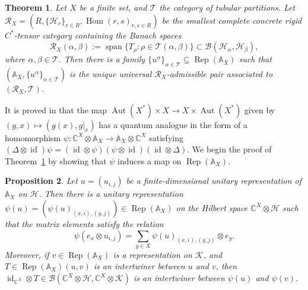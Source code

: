 \documentclass[12pt, a4paper]{amsart}
\def\Aut{\operatorname{Aut}}
\def\id{\operatorname{id}}
\def\Hom{\operatorname{Hom}}
\def\spn{\operatorname{span}}
\def\Rep{\operatorname{Rep}}
\def\A{\mathbb{A}}
\def\C{\mathbb{C}}
\def\BB{\mathcal{B}}
\def\CC{\mathcal{C}}
\def\HH{\mathcal{H}}
\def\KK{\mathcal{K}}
\def\RR{\mathcal{R}}
\def\TT{\mathcal{T}}
\newtheorem{thm}{Theorem}[section]
\newtheorem{prop}[thm]{Proposition}
\theoremstyle{definition}
\theoremstyle{remark}
\numberwithin{equation}{section}
\begin{document}
\begin{thm} \label{thm:TannakaKrein}
	Let $X$ be a finite set, and $\TT$ the category of tubular partitions. Let $\RR_X = (R, \{\HH_r\}_{r\in R}, \Hom(r,s)_{r,s\in R} )$ be the smallest complete concrete rigid $C^*$-tensor category containing the Banach spaces
	\[
	\RR_X(\alpha,\beta) := \spn\{T_\rho: \rho\in\TT(\alpha,\beta)\}\subset \BB(\HH_\alpha,\HH_\beta),
	\]
	where $\alpha,\beta\in\TT$. Then there is a family $\{u^\alpha\}_{\alpha\in\TT}\subseteq \operatorname{Rep}(\A_X)$ such that $(\mathbb{A}_X,\{u^\alpha\}_{\alpha\in\TT})$ is the unique universal $\RR_X$-admissible pair associated to $(\RR_X,\TT)$.
\end{thm}


It is proved in \cite[Theorem~4.5]{BR2025} that the map $\Aut(X^*)\times X\to X\times\Aut(X^*)$ given by $(g,x)\mapsto (g(x),g|_x)$ has a quantum analogue in the form of a homomorphism $\psi : \C^X \otimes \A_X \to \A_X\otimes\C^X$ satisfying $(\Delta\otimes\id)\psi = (\id\otimes\psi)(\psi\otimes\id)(\id\otimes\Delta)$. We begin the proof of Theorem~\ref{thm:TannakaKrein} by showing that $\psi$ induces a map on $\Rep(\A_X)$. 

\begin{prop} \label{prop:psiobj}
	Let $u = (u_{i,j})$ be a finite-dimensional unitary representation of $\A_X$ on $\HH$. Then there is a unitary representation $\psi(u) = (\psi(u)_{(x,i),(y,j)}) \in \Rep(\A_X)$ on the Hilbert space $\C^X\otimes \HH$
	such that the matrix elements satisfy the relation
	\[
	\psi(e_x\otimes u_{i,j}) = \sum_{y\in X}\psi(u)_{(x,i),(y,j)} \otimes e_y.
	\]
	Moreover, if $v \in \Rep(\A_X)$ is a representation on $\KK$, and $T\in\Rep(\A_X)(u,v)$ is an intertwiner between $u$ and $v$, then $	\id_{\C^X}\otimes T \in \BB(\C^X\otimes\HH,\C^X\otimes\KK)$	is an intertwiner between $\psi(u)$ and $\psi(v)$.
\end{prop}
\end{document}
